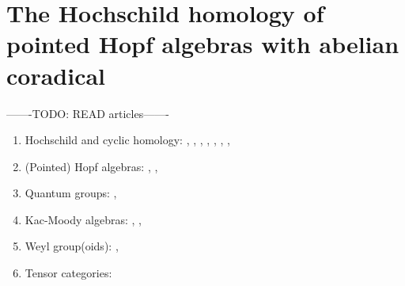\documentclass{amsart}
\theoremstyle{definition}
\begin{document}
\section{The Hochschild homology of pointed Hopf algebras with abelian coradical}



-------TODO: READ articles-------
\begin{enumerate}
	\item Hochschild and cyclic homology: 
		\cite{Andruskiewitsch2020}, 
		\cite{Burciu2007},
		\cite{Erdmann2019}, 
		\cite{Heckenberger2007}, 
		\cite{Kowalzig2014}, 
		\cite{Loday1998},
		\cite{Mastnak2009, Mastnak2010},
		\cite{Witherspoon2019}
	\item (Pointed) Hopf algebras: 
		\cite{Andruskiewitsch2002, Andruskiewitsch2010, Andruskiewitsch2017},
		\cite{Angiono2013},
		\cite{Angiono2019}
		\cite{Laugwitz2016}
		\cite{Montgomery1993}
		\cite{Pogorelsky2016}
		\cite{Radford2012}
		\cite{Vay2019}
	\item Quantum groups: 
		\cite{Joseph1995}, 
		\cite{Kassel1998} 
	\item Kac-Moody algebras: 
		\cite{Kac1990}, 
		\cite{Kumar2002}, 
	\item Weyl group(oids): 
		\cite{Cuntz2015, Cuntz2019}
		\cite{Angiono2018}, 
		\cite{Heckenberger2009, Heckenberger2010, Heckenberger2011} 
	\item Tensor categories: 
		\cite{Etingof2015} 
\end{enumerate}
\nocite{*}
\end{document}
